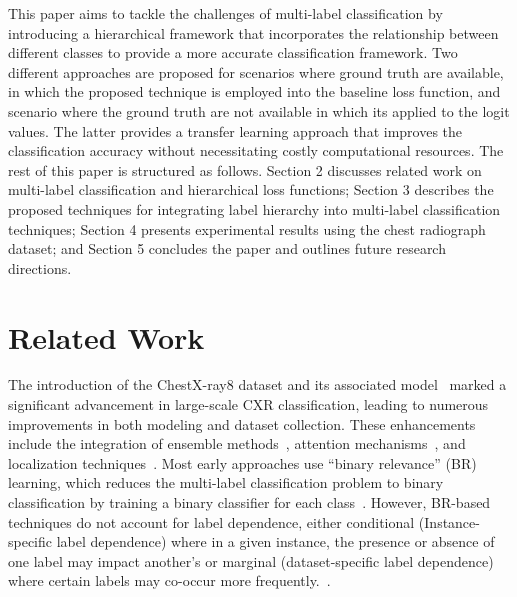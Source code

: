 This paper aims to tackle the challenges of multi-label classification by introducing a hierarchical framework that incorporates the relationship between different classes to provide a more accurate classification framework. Two different approaches are proposed for scenarios where ground truth are available, in which the proposed technique is employed into the baseline loss function, and scenario where the ground truth are not available in which its applied to the logit values. The latter provides a transfer learning approach that improves the classification accuracy without necessitating costly computational resources. The rest of this paper is structured as follows. Section 2 discusses related work on multi-label classification and hierarchical loss functions; Section 3 describes the proposed techniques for integrating label hierarchy into multi-label classification techniques; Section 4 presents experimental results using the chest radiograph dataset; and Section 5 concludes the paper and outlines future research directions.  

\section{Related Work}

The introduction of the ChestX-ray8 dataset and its associated model~\cite{wang_ChestXRay8_2017} marked a significant advancement in large-scale CXR classification, leading to numerous improvements in both modeling and dataset collection. These enhancements include the integration of ensemble methods~\cite{islam_Abnormality_2017}, attention mechanisms~\cite{guan_Diagnose_2018,liu_SDFN_2019}, and localization techniques~\cite{cai_Iterative_2018,guendel_MultiTask_2019,li_Thoracic_2018,yan_Weakly_2018}. Most early approaches use ``binary relevance'' (BR) learning, which reduces the multi-label classification problem to binary classification by training a binary classifier for each class~\cite{zhang_Review_2014}. However, BR-based techniques do not account for label dependence, either conditional (Instance-specific label dependence) where in a given instance, the presence or absence of one label may impact another's or marginal (dataset-specific label dependence) where certain labels may co-occur more frequently.~\cite{dembczynski_Label_2012}.


